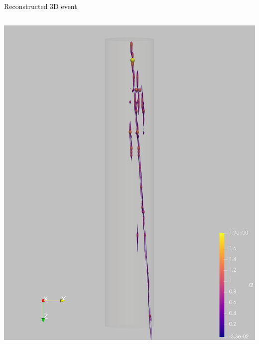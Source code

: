 \documentclass[]{beamer}
\begin{document}
\begin{frame}{Reconstructed 3D event}
	\begin{columns}[c]
		\centering
		\includegraphics[width=\textwidth]{viper/event967_pulses_q}
		\centering

\end{columns}
\end{frame}
\end{document}
